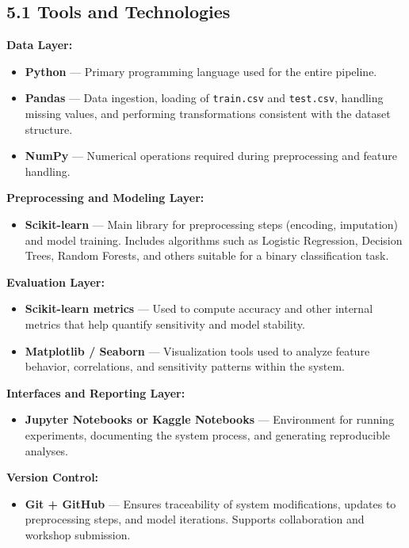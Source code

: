 \documentclass[12pt]{report}
\begin{document}
\subsection*{5.1 Tools and Technologies}

\textbf{Data Layer:}  
\begin{itemize}
    \item \textbf{Python} — Primary programming language used for the entire pipeline.
    \item \textbf{Pandas} — Data ingestion, loading of \texttt{train.csv} and \texttt{test.csv}, 
    handling missing values, and performing transformations consistent with the dataset structure.
    \item \textbf{NumPy} — Numerical operations required during preprocessing and feature handling.
\end{itemize}

\textbf{Preprocessing and Modeling Layer:}  
\begin{itemize}
    \item \textbf{Scikit-learn} — Main library for preprocessing steps (encoding, imputation) 
    and model training. Includes algorithms such as Logistic Regression, Decision Trees, 
    Random Forests, and others suitable for a binary classification task.
\end{itemize}

\textbf{Evaluation Layer:}  
\begin{itemize}
    \item \textbf{Scikit-learn metrics} — Used to compute accuracy and other internal metrics 
    that help quantify sensitivity and model stability.
    \item \textbf{Matplotlib / Seaborn} — Visualization tools used to analyze feature behavior, 
    correlations, and sensitivity patterns within the system.
\end{itemize}

\textbf{Interfaces and Reporting Layer:}  
\begin{itemize}
    \item \textbf{Jupyter Notebooks or Kaggle Notebooks} — Environment for running experiments, 
    documenting the system process, and generating reproducible analyses.
\end{itemize}

\textbf{Version Control:}  
\begin{itemize}
    \item \textbf{Git + GitHub} — Ensures traceability of system modifications, updates to 
    preprocessing steps, and model iterations. Supports collaboration and workshop submission.
\end{itemize}
\end{document}
